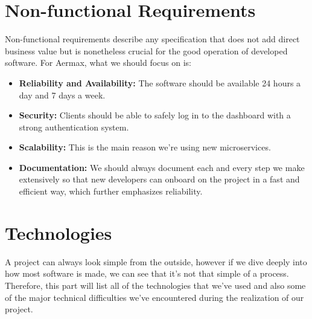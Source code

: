 \section{Non-functional Requirements}
Non-functional requirements describe any specification that does not add direct business value but is nonetheless crucial for the good operation of developed software.
For Aermax, what we should focus on is:
\begin{itemize}
	\item \textbf{Reliability and Availability:} The software should be available 24 hours a day and 7 days a week.
	\item \textbf{Security:} Clients should be able to safely log in to the dashboard with a strong authentication system.
	\item \textbf{Scalability:} This is the main reason we're using new microservices.
	\item \textbf{Documentation:} We should always document each and every step we make extensively so that new developers can onboard on the project in a fast and efficient way, which further emphasizes reliability.
\end{itemize}

\section{Technologies}
A project can always look simple from the outside, however if we dive deeply into how most software is made, we can see that it's not that simple of a process.
Therefore, this part will list all of the technologies that we've used and also some of the major technical difficulties we've encountered during the realization of our project.

\medskip

